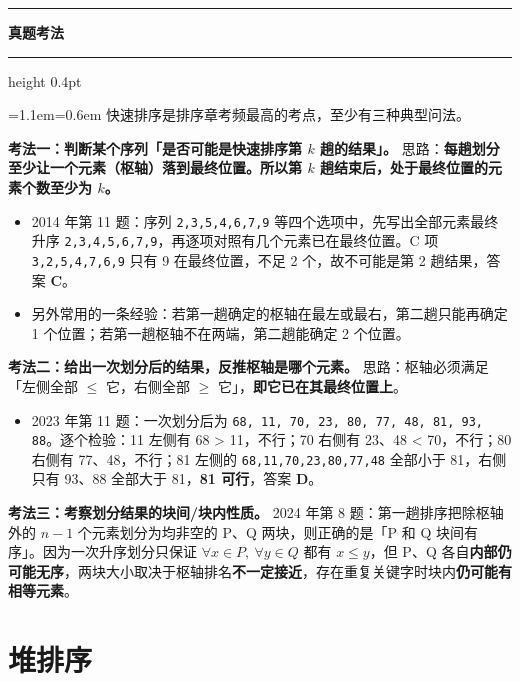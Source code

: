 \documentclass[11pt,openany,UTF8]{ctexbook}
\newcommand{\callouthead}[2]{%
  \par\addvspace{7pt}\noindent
  {\color{#1}\rule[-0.15em]{3pt}{1.05em}}\hspace{0.5em}%
  {\bfseries\color{#1}#2}\par\nobreak\vspace{-0.35em}%
  {\color{rulesep}\hrule height 0.4pt}\nobreak\vspace{0.45em}%
  \begingroup\small\setlength{\parindent}{0pt}%
  \leftskip=1.1em\rightskip=0.6em\noindent\ignorespaces}
\newcommand{\calloutend}{\par\endgroup\addvspace{7pt}}
\newenvironment{callexam}[1]{\callouthead{exambar}{#1}}{\calloutend}
\begin{document}
\begin{callexam}{真题考法}
快速排序是排序章考频最高的考点，至少有三种典型问法。

\textbf{考法一：判断某个序列「是否可能是快速排序第 $k$ 趟的结果」。} 思路：\textbf{每趟划分至少让一个元素（枢轴）落到最终位置。所以第 $k$ 趟结束后，处于最终位置的元素个数至少为 $k$。}

\begin{itemize}
\item 2014 年第 11 题：序列 \texttt{2,\allowbreak{}3,\allowbreak{}5,\allowbreak{}4,\allowbreak{}6,\allowbreak{}7,\allowbreak{}9} 等四个选项中，先写出全部元素最终升序 \texttt{2,\allowbreak{}3,\allowbreak{}4,\allowbreak{}5,\allowbreak{}6,\allowbreak{}7,\allowbreak{}9}，再逐项对照有几个元素已在最终位置。C 项 \texttt{3,\allowbreak{}2,\allowbreak{}5,\allowbreak{}4,\allowbreak{}7,\allowbreak{}6,\allowbreak{}9} 只有 9 在最终位置，不足 2 个，故不可能是第 2 趟结果，答案 \textbf{C}。
\item 另外常用的一条经验：若第一趟确定的枢轴在最左或最右，第二趟只能再确定 1 个位置；若第一趟枢轴不在两端，第二趟能确定 2 个位置。
\end{itemize}
\textbf{考法二：给出一次划分后的结果，反推枢轴是哪个元素。} 思路：枢轴必须满足「左侧全部 $\le$ 它，右侧全部 $\ge$ 它」，\textbf{即它已在其最终位置上}。

\begin{itemize}
\item 2023 年第 11 题：一次划分后为 \texttt{68,\allowbreak{} 11,\allowbreak{} 70,\allowbreak{} 23,\allowbreak{} 80,\allowbreak{} 77,\allowbreak{} 48,\allowbreak{} 81,\allowbreak{} 93,\allowbreak{} 88}。逐个检验：11 左侧有 68 > 11，不行；70 右侧有 23、48 < 70，不行；80 右侧有 77、48，不行；81 左侧的 \texttt{68,\allowbreak{}11,\allowbreak{}70,\allowbreak{}23,\allowbreak{}80,\allowbreak{}77,\allowbreak{}48} 全部小于 81，右侧只有 93、88 全部大于 81，\textbf{81 可行}，答案 \textbf{D}。
\end{itemize}
\textbf{考法三：考察划分结果的块间/块内性质。} 2024 年第 8 题：第一趟排序把除枢轴外的 $n-1$ 个元素划分为均非空的 P、Q 两块，则正确的是「P 和 Q 块间有序」。因为一次升序划分只保证 $\forall x\in P,\ \forall y\in Q$ 都有 $x\le y$，但 P、Q 各自\textbf{内部仍可能无序}，两块大小取决于枢轴排名\textbf{不一定接近}，存在重复关键字时块内\textbf{仍可能有相等元素}。

\end{callexam}

\section{堆排序}
\end{document}
